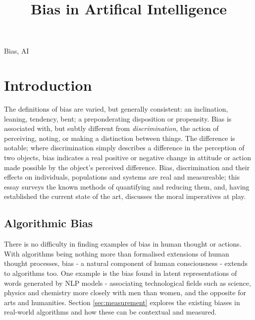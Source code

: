 \documentclass[conference]{IEEEtran}
\begin{document}
\title{Bias in Artifical Intelligence}
\author{
}
\maketitle
\begin{abstract}

\end{abstract}
\begin{IEEEkeywords}
Bias, AI
\end{IEEEkeywords}
\section{Introduction}
The definitions of bias are varied, but generally consistent: an inclination, leaning, tendency, bent; a preponderating disposition or propensity\cite{Bias}. Bias is associated with, but subtly different from \emph{discrimination}, the action of perceiving, noting, or making a distinction between things\cite{Discrimination}. The difference is notable; where discrimination simply describes a difference in the perception of two objects, bias indicates a real positive or negative change in attitude or action made possible by the object's perceived difference. Bias, discrimination and their effects on individuals, populations and systems are real and measureable; this essay surveys the known methods of quantifying and reducing them, and, having established the current state of the art, discusses the moral imperatives at play.
\subsection{Algorithmic Bias}
There is no difficulty in finding examples of bias in human thought\cite{FitzGerald2019} or actions\cite{NBERw22014}. With algorithms being nothing more than formalised extensions of human thought processes, bias - a natural component of human consciousness - extends to algorithms too. One example is the bias found in latent representations of words generated by NLP models\cite{pmlr-v97-brunet19a} - associating technological fields such as science, physics and chemistry more closely with men than women, and the opposite for arts and humanities. Section \ref{sec:measurement} explores the existing biases in real-world algorithms and how these can be contextual and measured.
\end{document}

